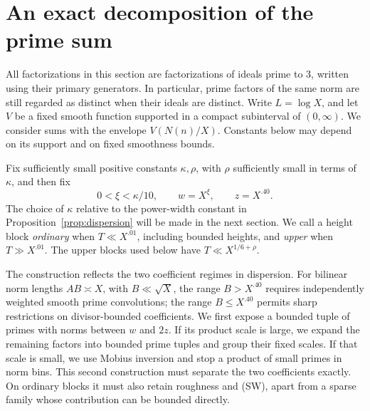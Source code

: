 \section{An exact decomposition of the prime sum}
\label{sec:decomposition}

All factorizations in this section are factorizations of ideals prime to
$3$, written using their primary generators.  In particular, prime
factors of the same norm are still regarded as distinct when their
ideals are distinct.  Write $L=\log X$, and let $V$ be a fixed smooth
function supported in a compact subinterval of $(0,\infty)$.
We consider sums with the envelope $V(N(n)/X)$.  Constants below may
depend on its support and on fixed smoothness bounds.

Fix sufficiently small positive constants $\kappa,\rho$, with
$\rho$ sufficiently small in terms of $\kappa$, and then fix
\[
 0<\xi<\kappa/10,\qquad w=X^\xi,\qquad z=X^{.40}.
\]
The choice of $\kappa$ relative to the power-width constant in
Proposition~\ref{prop:dispersion} will be made in the next section.
We call a height block \emph{ordinary} when $T\ll X^{.01}$, including
bounded heights, and \emph{upper} when $T\gg X^{.01}$.  The upper
blocks used below have $T\ll X^{1/6+\rho}$.

The construction reflects the two coefficient regimes in dispersion.
For bilinear norm lengths $AB\asymp X$, with $B\ll\sqrt X$,
the range $B>X^{.40}$ requires independently weighted smooth prime
convolutions; the range $B\le X^{.40}$ permits sharp restrictions on
divisor-bounded coefficients.  We first expose a bounded tuple of
primes with norms between $w$ and $2z$.  If its product scale is large,
we expand the remaining factors into bounded prime tuples and group
their fixed scales.  If that scale is small, we use Mobius inversion
and stop a product of small primes in norm bins.  This second
construction must separate the two coefficients exactly.  On ordinary
blocks it must also retain roughness and \textup{(SW)}, apart from a
sparse family whose contribution can be bounded directly.


